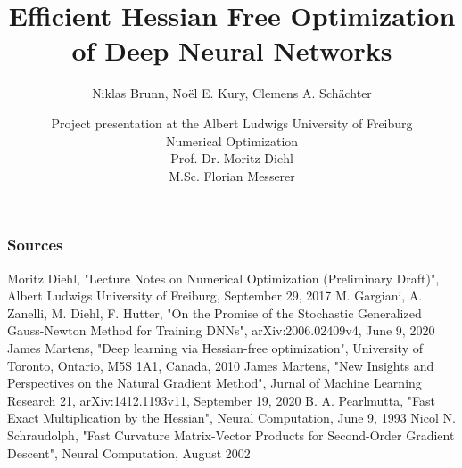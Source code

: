 \documentclass{beamer}
\title[Hessian Free Optimization]{Efficient Hessian Free Optimization of Deep Neural Networks}
\subtitle{Niklas Brunn, No\"{e}l E. Kury, Clemens A. Schächter}
\author[Numerical Optimization]{Project presentation at the Albert Ludwigs University of Freiburg\\
Numerical Optimization\\
Prof. Dr. Moritz Diehl\\
M.Sc. Florian Messerer}
\begin{document}
	
	\begin{frame}
		\titlepage
	\end{frame}
	
	
	
	
	


	\begin{frame}
		\frametitle{Sources}
		\begin{thebibliography}{9}
			
			 Moritz Diehl, "Lecture Notes on Numerical Optimization (Preliminary Draft)", Albert Ludwigs University of Freiburg, September 29, 2017	
			 M. Gargiani, A. Zanelli, M. Diehl, F. Hutter, "On the Promise of the Stochastic Generalized Gauss-Newton Method for Training DNNs",  arXiv:2006.02409v4, June 9, 2020 
			 James Martens, "Deep learning via Hessian-free optimization", University of Toronto, Ontario, M5S 1A1, Canada, 2010
			 James Martens, "New Insights and Perspectives on the Natural Gradient Method", Jurnal of Machine Learning Research 21, arXiv:1412.1193v11, September 19, 2020
			 B. A. Pearlmutta, "Fast Exact Multiplication by the Hessian", Neural Computation, June 9, 1993
			 Nicol N. Schraudolph, "Fast Curvature Matrix-Vector Products for Second-Order
			Gradient Descent", Neural Computation, August 2002
			
			
		\end{thebibliography}
	\end{frame}
	
\end{document}
